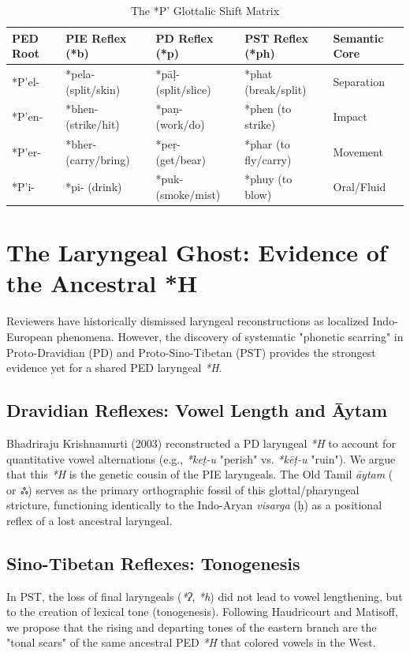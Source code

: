 \documentclass[11pt,a4paper]{article}
\begin{document}
\begin{table}[h]
\centering
\begin{tabular}{@{}lllll@{}}
\toprule
\textbf{PED Root} & \textbf{PIE Reflex (*b)} & \textbf{PD Reflex (*p)} & \textbf{PST Reflex (*ph)} & \textbf{Semantic Core} \\ \midrule
*P'el- & *pela- (split/skin) & *pā\d{l}- (split/slice) & *phat (break/split) & Separation \\
*P'en- & *bhen- (strike/hit) & *pa\d{n}- (work/do) & *phen (to strike) & Impact \\
*P'er- & *bher- (carry/bring) & *pe\d{r}- (get/bear) & *phar (to fly/carry) & Movement \\
*P'i- & *pi- (drink) & *puk- (smoke/mist) & *phuy (to blow) & Oral/Fluid \\ \bottomrule
\end{tabular}
\caption{The *P' Glottalic Shift Matrix}
\end{table}

\section{The Laryngeal Ghost: Evidence of the Ancestral *H}
Reviewers have historically dismissed laryngeal reconstructions as localized Indo-European phenomena. However, the discovery of systematic "phonetic scarring" in Proto-Dravidian (PD) and Proto-Sino-Tibetan (PST) provides the strongest evidence yet for a shared PED laryngeal \textit{*H}.

\subsection{Dravidian Reflexes: Vowel Length and Āytam}
Bhadriraju Krishnamurti (2003) reconstructed a PD laryngeal \textit{*H} to account for quantitative vowel alternations (e.g., \textit{*ke\d{t}-u} "perish" vs. \textit{*k\={e}\d{t}-u} "ruin"). We argue that this \textit{*H} is the genetic cousin of the PIE laryngeals. The Old Tamil \textit{\={a}ytam} ( or ஃ) serves as the primary orthographic fossil of this glottal/pharyngeal stricture, functioning identically to the Indo-Aryan \textit{visarga} (\d{h}) as a positional reflex of a lost ancestral laryngeal.

\subsection{Sino-Tibetan Reflexes: Tonogenesis}
In PST, the loss of final laryngeals (\textit{*ʔ}, \textit{*h}) did not lead to vowel lengthening, but to the creation of lexical tone (tonogenesis). Following Haudricourt and Matisoff, we propose that the rising and departing tones of the eastern branch are the "tonal scars" of the same ancestral PED \textit{*H} that colored vowels in the West.
\end{document}
